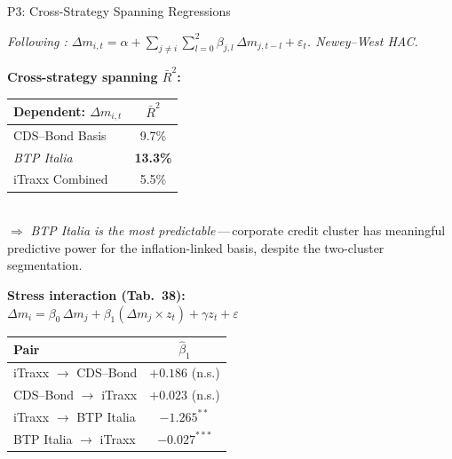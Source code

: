 \documentclass[aspectratio=169,11pt]{beamer}
\newcommand{\hlt}[1]{\textcolor{edhecred}{\textbf{#1}}}     %
\begin{document}
\begin{frame}[t]{P3: Cross-Strategy Spanning Regressions}
\centering
\scriptsize
\vspace{0.05cm}

\textit{Following \citet{fleckenstein2014tips}: $\Delta m_{i,t} = \alpha + \sum_{j\neq i}\sum_{l=0}^{2} \beta_{j,l}\,\Delta m_{j,t-l} + \varepsilon_t$.
Newey--West HAC.}

\vspace{0.20cm}

\begin{minipage}[t]{0.46\textwidth}
\centering
\textbf{Cross-strategy spanning $\bar R^2$:}\\[0.10cm]
\renewcommand{\arraystretch}{1.20}
\setlength{\tabcolsep}{6pt}
\begin{tabular}{lc}
\toprule
Dependent: $\Delta m_{i,t}$ & $\bar R^2$ \\
\midrule
CDS--Bond Basis        & 9.7\% \\
\textit{BTP Italia}    & \hlt{13.3\%} \\
iTraxx Combined        & 5.5\% \\
\bottomrule
\end{tabular}\\[0.20cm]
{\footnotesize $\Rightarrow$ \emph{BTP Italia is the most predictable}\,---\,corporate credit cluster has meaningful predictive power for the inflation-linked basis, despite the two-cluster segmentation.}
\end{minipage}\hfill
\begin{minipage}[t]{0.50\textwidth}
\centering
\textbf{Stress interaction (Tab.\ 38):}\\[0.05cm]
{\footnotesize $\Delta m_i = \beta_0\,\Delta m_j + \beta_1(\Delta m_j \times z_t) + \gamma z_t + \varepsilon$}\\[0.15cm]
\renewcommand{\arraystretch}{1.30}
\setlength{\tabcolsep}{4pt}
\begin{tabular}{lc}
\toprule
Pair & $\hat\beta_1$ \\
\midrule
\rowcolor{mygreen!15}
iTraxx $\to$ CDS--Bond  & $+0.186$ (n.s.) \\
\rowcolor{mygreen!15}
CDS--Bond $\to$ iTraxx  & $+0.023$ (n.s.) \\
\midrule
\rowcolor{myred!15}
iTraxx $\to$ BTP Italia & \hlt{$-1.265^{**}$} \\
\rowcolor{myred!15}
BTP Italia $\to$ iTraxx & \hlt{$-0.027^{***}$} \\
\bottomrule
\end{tabular}
\end{minipage}


\end{frame}
\end{document}
